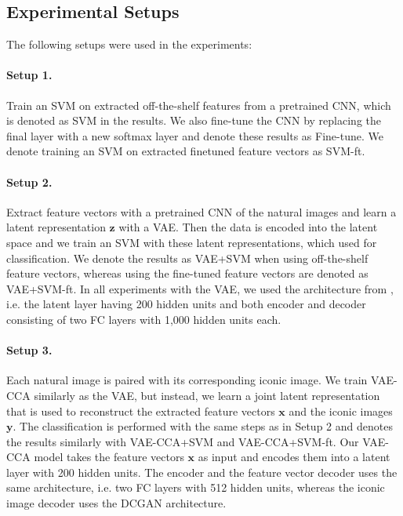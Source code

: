 \subsection{Experimental Setups}\label{subsec:experimental-setups}

The following setups were used in the experiments: 

\vspace{-2mm}
\paragraph{Setup 1.} Train an SVM on extracted off-the-shelf features from a pretrained CNN, which is denoted as SVM in the results. We also fine-tune the CNN by replacing the final layer with a new softmax layer and denote these results as Fine-tune. We denote training an SVM on extracted finetuned feature vectors as SVM-ft.

\vspace{-2mm}
\paragraph{Setup 2.} Extract feature vectors with a pretrained CNN of the natural images and learn a latent representation $\mathbf{z}$ with a VAE. Then the data is encoded into the latent space and we train an SVM with these latent representations, which used for classification. We denote the results as VAE+SVM when using off-the-shelf feature vectors, whereas using the fine-tuned feature vectors are denoted as VAE+SVM-ft. In all experiments with the VAE, we used the architecture from , i.e. the latent layer having 200 hidden units and both encoder and decoder consisting of two FC layers with 1,000 hidden units each.

\vspace{-2mm}
\paragraph{Setup 3.} Each natural image is paired with its corresponding iconic image. We train VAE-CCA similarly as the VAE, but instead, we learn a joint latent representation that is used to reconstruct the extracted feature vectors $\mathbf{x}$ and the iconic images $\mathbf{y}$. The classification is performed with the same steps as in Setup 2 and denotes the results similarly with VAE-CCA+SVM and VAE-CCA+SVM-ft. Our VAE-CCA model takes the feature vectors $\mathbf{x}$ as input and encodes them into a latent layer with 200 hidden units. The encoder and the feature vector decoder uses the same architecture, i.e. two FC layers with 512 hidden units, whereas the iconic image decoder uses the DCGAN  architecture.


